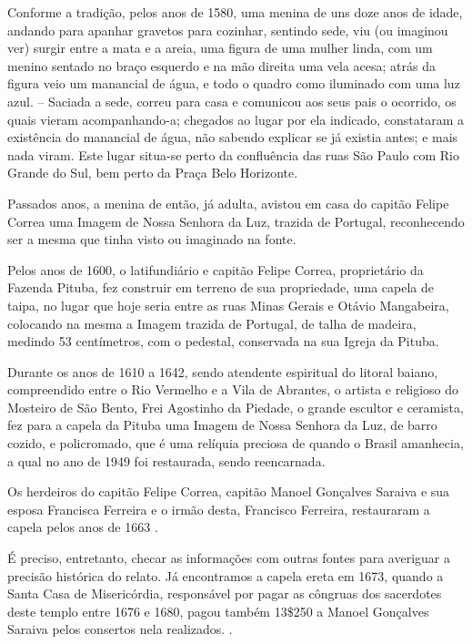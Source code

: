 \begin{citacao}
Conforme a tradição, pelos anos de 1580, uma menina de uns doze anos de idade, andando para apanhar gravetos para cozinhar, sentindo sede, viu (ou imaginou ver) surgir entre a mata e a areia, uma figura de uma mulher linda, com um menino sentado no braço esquerdo e na mão direita uma vela acesa; atrás da figura veio um manancial de água, e todo o quadro como iluminado com uma luz azul. – Saciada a sede, correu para casa e comunicou aos seus pais o ocorrido, os quais vieram acompanhando-a; chegados ao lugar por ela indicado, constataram a existência do manancial de água, não sabendo explicar se já existia antes; e mais nada viram. Este lugar situa-se perto da confluência das ruas São Paulo com Rio Grande do Sul, bem perto da Praça Belo Horizonte.

Passados anos, a menina de então, já adulta, avistou em casa do capitão Felipe Correa uma Imagem de Nossa Senhora da Luz, trazida de Portugal, reconhecendo ser a mesma que tinha visto ou imaginado na fonte.

Pelos anos de 1600, o latifundiário e capitão Felipe Correa, proprietário da Fazenda Pituba, fez construir em terreno de sua propriedade, uma capela de taipa, no lugar que hoje seria entre as ruas Minas Gerais e Otávio Mangabeira, colocando na mesma a Imagem trazida de Portugal, de talha de madeira, medindo 53 centímetros, com o pedestal, conservada na sua Igreja da Pituba.

Durante os anos de 1610 a 1642, sendo atendente espiritual do litoral baiano, compreendido entre o Rio Vermelho e a Vila de Abrantes, o artista e religioso do Mosteiro de São Bento, Frei Agostinho da Piedade, o grande escultor e ceramista, fez para a capela da Pituba uma Imagem de Nossa Senhora da Luz, de barro cozido, e policromado, que é uma relíquia preciosa de quando o Brasil amanhecia, a qual no ano de 1949 foi restaurada, sendo reencarnada.

Os herdeiros do capitão Felipe Correa, capitão Manoel Gonçalves Saraiva e sua esposa Francisca Ferreira e o irmão desta, Francisco Ferreira, restauraram a capela pelos anos de 1663 \cite{fernandez_historia_1969}.
\end{citacao}

É preciso, entretanto, checar as informações com outras fontes para averiguar a precisão histórica do relato. Já encontramos a capela ereta em 1673, quando a Santa Casa de Misericórdia, responsável por pagar as côngruas dos sacerdotes deste templo entre 1676 e 1680, pagou também 13\$250 a Manoel Gonçalves Saraiva pelos consertos nela realizados. \cite[p.~11]{ott_engenhos_1996}. 

